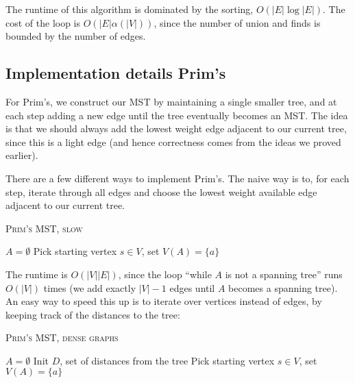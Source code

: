 The runtime of this algorithm is dominated by the sorting, $O(\vert E\vert\log \vert E\vert)$. The cost of the loop is $O(\vert E\vert \alpha(\vert V\vert))$, since the number of union and finds is bounded by the number of edges. 

\subsection{Implementation details Prim's}

For Prim's, we construct our MST by maintaining a single smaller tree, and at each step adding a new edge until the tree eventually becomes an MST. The idea is that we should always add the lowest weight edge adjacent to our current tree, since this is a light edge (and hence correctness comes from the ideas we proved earlier). 

There are a few different ways to implement Prim's. The naive way is to, for each step, iterate through all edges and choose the lowest weight available edge adjacent to our current tree. \V

\begin{algorithm}[H]
\DontPrintSemicolon
\SetNoFillComment

\caption{\textsc{Prim's MST, slow}}\label{alg:primslow}
$A = \emptyset$\;
Pick starting vertex $s\in V$, set $V(A)=\{a\}$\;
\;
\end{algorithm}\medskip

The runtime is $O(\vert V\vert \vert E\vert)$, since the loop ``while $A$ is not a spanning tree'' runs $O(\vert V\vert)$ times (we add exactly $\vert V\vert-1$ edges until $A$ becomes a spanning tree). An easy way to speed this up is to iterate over vertices instead of edges, by keeping track of the distances to the tree: \medskip

\begin{algorithm}[H]
\DontPrintSemicolon
\SetNoFillComment

\caption{\textsc{Prim's MST, dense graphs}}\label{alg:primdense}
$A = \emptyset$\;
Init $D$, set of distances from the tree\;
Pick starting vertex $s\in V$, set $V(A)=\{a\}$\;
\;
\end{algorithm}\medskip

